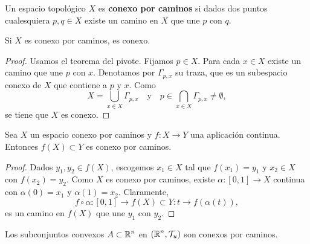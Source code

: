 \begin{definition}
Un espacio topológico $\displaystyle X $ es \textbf{conexo por caminos} si dados dos puntos cualesquiera $\displaystyle p,q\in X $ existe un camino en $\displaystyle X $ que une $\displaystyle p $ con $\displaystyle q $.
\end{definition}
\begin{prop}
Si $\displaystyle X $ es conexo por caminos, es conexo.
\end{prop}
\begin{proof}
Usamos el teorema del pivote. Fijamos $\displaystyle p \in X $. Para cada $\displaystyle x \in X $ existe un camino que une $\displaystyle p $ con $\displaystyle x $. Denotamos por $\displaystyle \Gamma_{p,x} $ su traza, que es un subespacio conexo de $\displaystyle X $ que contiene a $\displaystyle p $ y $\displaystyle x $. Como 
\[X = \bigcup_{x \in X}\Gamma_{p,x} \quad \text{y} \quad p \in \bigcap_{x \in X}\Gamma_{p,x}\neq \emptyset ,\]
se tiene que $\displaystyle X $ es conexo.
\end{proof}
\begin{prop}
Sea $\displaystyle X $ un espacio conexo por caminos y $\displaystyle f : X \to Y $ una aplicación continua. Entonces $\displaystyle f\left(X\right)\subset Y $ es conexo por caminos. 
\end{prop}
\begin{proof}
	Dados $\displaystyle y_{1}, y_{2}\in f\left(X\right) $, escogemos $\displaystyle x_{1}\in X $ tal que $\displaystyle f\left(x_{1}\right)=y_{1} $ y $\displaystyle x_{2}\in X $ con $\displaystyle f\left(x_{2}\right)=y_{2} $. Como $\displaystyle X $ es conexo por caminos, existe $\displaystyle \alpha : \left[0,1\right] \to X $ continua con $\displaystyle \alpha\left(0\right)=x_{1} $ y $\displaystyle \alpha\left(1\right)=x_{2} $. Claramente, 
	\[f\circ \alpha : \left[0,1\right] \to f\left(X\right)\subset Y : t \to f\left(\alpha\left(t\right)\right) ,\]
	es un camino en $\displaystyle f\left(X\right) $ que une $\displaystyle y_{1} $ con $\displaystyle y_{2} $.
\end{proof}
\begin{eg}
Los subconjuntos convexos $\displaystyle A \subset \mathbb{R}^{n} $ en $\displaystyle \left(\mathbb{R}^{n}, \mathcal{T}_{u}\right) $ son conexos por caminos. 
\end{eg}

